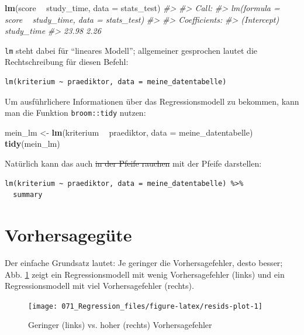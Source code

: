 \documentclass[12pt,ngerman,]{book}
\makeatletter
\newenvironment{Shaded}{\begin{snugshade}}{\end{snugshade}}
\newcommand{\KeywordTok}[1]{\textcolor[rgb]{0.13,0.29,0.53}{\textbf{#1}}}
\newcommand{\DataTypeTok}[1]{\textcolor[rgb]{0.13,0.29,0.53}{#1}}
\newcommand{\StringTok}[1]{\textcolor[rgb]{0.31,0.60,0.02}{#1}}
\newcommand{\CommentTok}[1]{\textcolor[rgb]{0.56,0.35,0.01}{\textit{#1}}}
\newcommand{\OperatorTok}[1]{\textcolor[rgb]{0.81,0.36,0.00}{\textbf{#1}}}
\newcommand{\NormalTok}[1]{#1}
\newenvironment{kframe}{%
\medskip{}
\setlength{\fboxsep}{.8em}
 \def\at@end@of@kframe{}%
 \ifinner\ifhmode%
  \def\at@end@of@kframe{\end{minipage}}%
  \begin{minipage}{\columnwidth}%
 \fi\fi%
 \def\FrameCommand##1{\hskip\@totalleftmargin \hskip-\fboxsep
 \colorbox{shadecolor}{##1}\hskip-\fboxsep
     \hskip-\linewidth \hskip-\@totalleftmargin \hskip\columnwidth}%
 \MakeFramed {\advance\hsize-\width
   \@totalleftmargin\z@ \linewidth\hsize
   \@setminipage}}%
 {\par\unskip\endMakeFramed%
 \at@end@of@kframe}
\renewenvironment{Shaded}{\begin{kframe}}{\end{kframe}}
\theoremstyle{definition}
\theoremstyle{definition}
\theoremstyle{remark}
\makeatother
\begin{document}
\begin{Shaded}
\begin{Highlighting}[]
\KeywordTok{lm}\NormalTok{(score }\OperatorTok{~}\StringTok{ }\NormalTok{study_time, }\DataTypeTok{data =}\NormalTok{ stats_test)}
\CommentTok{#> }
\CommentTok{#> Call:}
\CommentTok{#> lm(formula = score ~ study_time, data = stats_test)}
\CommentTok{#> }
\CommentTok{#> Coefficients:}
\CommentTok{#> (Intercept)   study_time  }
\CommentTok{#>       23.98         2.26}
\end{Highlighting}
\end{Shaded}

\texttt{lm} steht dabei für ``lineares Modell''; allgemeiner gesprochen
lautet die Rechtschreibung für diesen Befehl:

\begin{verbatim}
lm(kriterium ~ praediktor, data = meine_datentabelle)
\end{verbatim}

Um ausführlichere Informationen über das Regressionsmodell zu bekommen,
kann man die Funktion \texttt{broom::tidy} nutzen:

\begin{Shaded}
\begin{Highlighting}[]
\NormalTok{mein_lm <-}\StringTok{ }\KeywordTok{lm}\NormalTok{(kriterium }\OperatorTok{~}\StringTok{ }\NormalTok{praediktor, }\DataTypeTok{data =}\NormalTok{ meine_datentabelle)}
\KeywordTok{tidy}\NormalTok{(mein_lm)}
\end{Highlighting}
\end{Shaded}

Natürlich kann das auch \sout{in der Pfeife rauchen} mit der Pfeife
darstellen:

\begin{verbatim}
lm(kriterium ~ praediktor, data = meine_datentabelle) %>% 
  summary
\end{verbatim}

\section{Vorhersagegüte}\label{vorhersagegute}

Der einfache Grundsatz lautet: Je geringer die Vorhersagefehler, desto
besser; Abb. \ref{fig:resids-plot} zeigt ein Regressionsmodell mit wenig
Vorhersagefehler (links) und ein Regressionsmodell mit viel
Vorhersagefehler (rechts).

\begin{figure}

{\centering \texttt{[image: 071\_Regression\_files/figure-latex/resids-plot-1]} 

}

\caption{Geringer (links) vs. hoher (rechts) Vorhersagefehler}\label{fig:resids-plot}
\end{figure}
\end{document}
